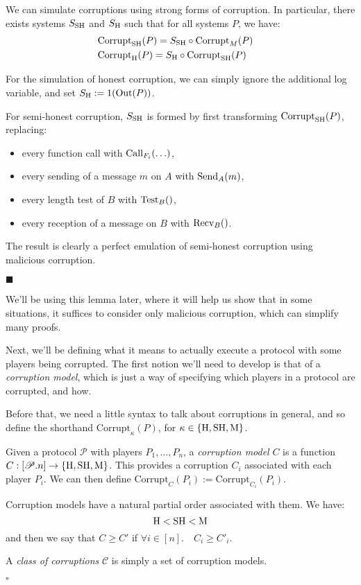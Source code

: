 \begin{lemma}
  \label{thm:simulatingcorruption}
  We can simulate corruptions using strong forms of corruption.
  In particular, there exists systems $S_{\text{SH}}$ and $S_{\text{H}}$ such that
  for all systems $P$, we have:
  \[
    \begin{aligned}
      &\text{Corrupt}_{\text{SH}}(P) = S_{\text{SH}} \circ \text{Corrupt}_M(P)\cr
      &\text{Corrupt}_{\text{H}}(P) = S_{\text{H}} \circ \text{Corrupt}_{\text{SH}}(P)
    \end{aligned}
  \]

For the simulation of honest corruption, we can simply ignore
  the additional log variable, and set $S_{\text{H}} := 1(\text{Out}(P))$.

For semi-honest corruption, $S_{\text{SH}}$ is formed by first transforming
$\text{Corrupt}_{\text{SH}}(P)$, replacing:
\begin{itemize}
  \item every function call with $\text{Call}_{F_i}(\ldots)$,
  \item every sending of a message $m$ on $A$ with $\text{Send}_A(m)$,
  \item every length test of $B$ with $\text{Test}_B()$,
  \item every reception of a message on $B$ with $\text{Recv}_B()$.
\end{itemize}

The result is clearly a perfect emulation of semi-honest corruption
using malicious corruption.

$\blacksquare$
\end{lemma}

We'll be using this lemma later, where it will help us show
that in some situations, it suffices to consider only malicious
corruption, which can simplify many proofs.

Next, we'll be defining what it means to actually execute
a protocol with some players being corrupted.
The first notion we'll need to develop is that of a \emph{corruption model},
which is just a way of specifying which players in a protocol are corrupted,
and how.

Before that, we need a little syntax to talk about corruptions in general,
and so define the shorthand $\text{Corrupt}_\kappa(P)$,
for $\kappa \in \{\text{H}, \text{SH}, \text{M}\}$.

\begin{definition}
Given a protocol $\mathscr{P}$ with players $P_1, \ldots, P_n$, a \emph{corruption model} $C$
is a function $C : [\mathscr{P}.n] \to \{\text{H}, \text{SH}, \text{M}\}$.
This provides a corruption $C_i$ associated with each player $P_i$.
We can then define $\text{Corrupt}_C(P_i) := \text{Corrupt}_{C_i}(P_i)$.

Corruption models have a natural partial order associated with them. 
We have:
$$
\text{H} < \text{SH} < \text{M}
$$
  and then we say that $C \geq C'$ if $\forall i \in [n]. \quad C_i \geq C'_i$.

A \emph{class of corruptions} $\mathscr{C}$ is simply a set of corruption models.

$\square$
\end{definition}

